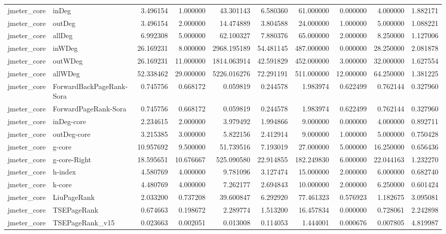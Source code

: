 \begin{tabular}{llrrrrrrrr}
jmeter_core & inDeg & 3.496154 & 1.000000 & 43.301143 & 6.580360 & 61.000000 & 0.000000 & 4.000000 & 1.882171 \\
jmeter_core & outDeg & 3.496154 & 2.000000 & 14.474889 & 3.804588 & 24.000000 & 1.000000 & 5.000000 & 1.088221 \\
jmeter_core & allDeg & 6.992308 & 5.000000 & 62.100327 & 7.880376 & 65.000000 & 2.000000 & 8.250000 & 1.127006 \\
jmeter_core & inWDeg & 26.169231 & 8.000000 & 2968.195189 & 54.481145 & 487.000000 & 0.000000 & 28.250000 & 2.081878 \\
jmeter_core & outWDeg & 26.169231 & 11.000000 & 1814.063914 & 42.591829 & 452.000000 & 3.000000 & 32.000000 & 1.627554 \\
jmeter_core & allWDeg & 52.338462 & 29.000000 & 5226.016276 & 72.291191 & 511.000000 & 12.000000 & 64.250000 & 1.381225 \\
jmeter_core & ForwardBackPageRank-Sora & 0.745756 & 0.668172 & 0.059819 & 0.244578 & 1.983974 & 0.622499 & 0.762144 & 0.327960 \\
jmeter_core & ForwardPageRank-Sora & 0.745756 & 0.668172 & 0.059819 & 0.244578 & 1.983974 & 0.622499 & 0.762144 & 0.327960 \\
jmeter_core & inDeg-core & 2.234615 & 2.000000 & 3.979492 & 1.994866 & 9.000000 & 0.000000 & 4.000000 & 0.892711 \\
jmeter_core & outDeg-core & 3.215385 & 3.000000 & 5.822156 & 2.412914 & 9.000000 & 1.000000 & 5.000000 & 0.750428 \\
jmeter_core & g-core & 10.957692 & 9.500000 & 51.739516 & 7.193019 & 27.000000 & 5.000000 & 16.250000 & 0.656436 \\
jmeter_core & g-core-Right & 18.595651 & 10.676667 & 525.090580 & 22.914855 & 182.249830 & 6.000000 & 22.044163 & 1.232270 \\
jmeter_core & h-index & 4.580769 & 4.000000 & 9.781096 & 3.127474 & 15.000000 & 2.000000 & 6.000000 & 0.682740 \\
jmeter_core & k-core & 4.480769 & 4.000000 & 7.262177 & 2.694843 & 10.000000 & 2.000000 & 6.250000 & 0.601424 \\
jmeter_core & LiuPageRank & 2.033200 & 0.737208 & 39.600847 & 6.292920 & 77.461323 & 0.576923 & 1.182675 & 3.095081 \\
jmeter_core & TSEPageRank & 0.674663 & 0.198672 & 2.289774 & 1.513200 & 16.457834 & 0.000000 & 0.728061 & 2.242898 \\
jmeter_core & TSEPageRank_v15 & 0.023663 & 0.002051 & 0.013008 & 0.114053 & 1.444001 & 0.000676 & 0.007805 & 4.819987 \\

\end{tabular}

